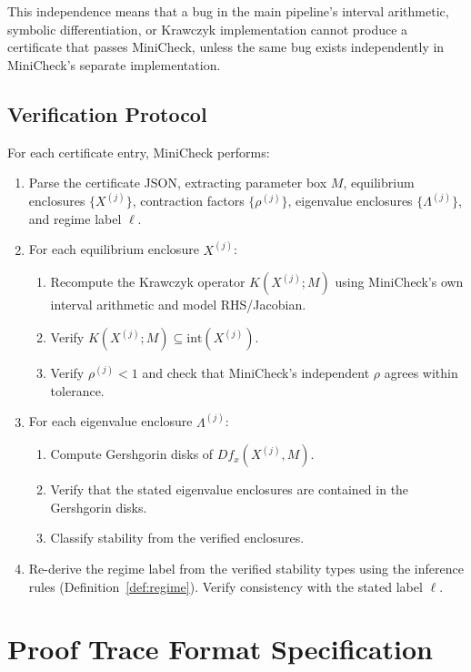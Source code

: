 \documentclass[11pt]{article}
\begin{document}
This independence means that a bug in the main pipeline's interval arithmetic, symbolic differentiation, or Krawczyk implementation cannot produce a certificate that passes MiniCheck, unless the same bug exists independently in MiniCheck's separate implementation.

\subsection{Verification Protocol}

For each certificate entry, MiniCheck performs:
\begin{enumerate}
\item Parse the certificate JSON, extracting parameter box $M$, equilibrium enclosures $\{X^{(j)}\}$, contraction factors $\{\rho^{(j)}\}$, eigenvalue enclosures $\{\Lambda^{(j)}\}$, and regime label $\ell$.

\item For each equilibrium enclosure $X^{(j)}$:
\begin{enumerate}[label=(\alph*)]
\item Recompute the Krawczyk operator $K(X^{(j)}; M)$ using MiniCheck's own interval arithmetic and model RHS/Jacobian.
\item Verify $K(X^{(j)}; M) \subseteq \mathrm{int}(X^{(j)})$.
\item Verify $\rho^{(j)} < 1$ and check that MiniCheck's independent $\rho$ agrees within tolerance.
\end{enumerate}

\item For each eigenvalue enclosure $\Lambda^{(j)}$:
\begin{enumerate}[label=(\alph*)]
\item Compute Gershgorin disks of $Df_x(X^{(j)}, M)$.
\item Verify that the stated eigenvalue enclosures are contained in the Gershgorin disks.
\item Classify stability from the verified enclosures.
\end{enumerate}

\item Re-derive the regime label from the verified stability types using the inference rules (Definition~\ref{def:regime}).
Verify consistency with the stated label $\ell$.
\end{enumerate}

\section{Proof Trace Format Specification}
\label{app:proof-trace}
\end{document}
